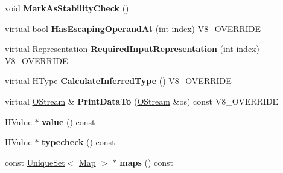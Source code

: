 \begin{DoxyCompactItemize}
\item 
\hypertarget{classv8_1_1internal_1_1_v8___f_i_n_a_l_a2334ff05114c5804c9eb729aab11bbf3}{}void {\bfseries Mark\+As\+Stability\+Check} ()\label{classv8_1_1internal_1_1_v8___f_i_n_a_l_a2334ff05114c5804c9eb729aab11bbf3}

\item 
\hypertarget{classv8_1_1internal_1_1_v8___f_i_n_a_l_ae559b1a39de93c2925ab5815da490738}{}virtual bool {\bfseries Has\+Escaping\+Operand\+At} (int index) V8\+\_\+\+O\+V\+E\+R\+R\+I\+D\+E\label{classv8_1_1internal_1_1_v8___f_i_n_a_l_ae559b1a39de93c2925ab5815da490738}

\item 
\hypertarget{classv8_1_1internal_1_1_v8___f_i_n_a_l_a6c6d1f37f40b113d8f4062f1ffff7215}{}virtual \hyperlink{classv8_1_1internal_1_1_representation}{Representation} {\bfseries Required\+Input\+Representation} (int index) V8\+\_\+\+O\+V\+E\+R\+R\+I\+D\+E\label{classv8_1_1internal_1_1_v8___f_i_n_a_l_a6c6d1f37f40b113d8f4062f1ffff7215}

\item 
\hypertarget{classv8_1_1internal_1_1_v8___f_i_n_a_l_a7a6782b8660ab150601db2ff28262edd}{}virtual H\+Type {\bfseries Calculate\+Inferred\+Type} () V8\+\_\+\+O\+V\+E\+R\+R\+I\+D\+E\label{classv8_1_1internal_1_1_v8___f_i_n_a_l_a7a6782b8660ab150601db2ff28262edd}

\item 
\hypertarget{classv8_1_1internal_1_1_v8___f_i_n_a_l_ac450dad970b14246be761ccf5004924b}{}virtual \hyperlink{classv8_1_1internal_1_1_o_stream}{O\+Stream} \& {\bfseries Print\+Data\+To} (\hyperlink{classv8_1_1internal_1_1_o_stream}{O\+Stream} \&os) const V8\+\_\+\+O\+V\+E\+R\+R\+I\+D\+E\label{classv8_1_1internal_1_1_v8___f_i_n_a_l_ac450dad970b14246be761ccf5004924b}

\item 
\hypertarget{classv8_1_1internal_1_1_v8___f_i_n_a_l_a998b3feae0e84bbe080297551603911f}{}\hyperlink{classv8_1_1internal_1_1_h_value}{H\+Value} $\ast$ {\bfseries value} () const \label{classv8_1_1internal_1_1_v8___f_i_n_a_l_a998b3feae0e84bbe080297551603911f}

\item 
\hypertarget{classv8_1_1internal_1_1_v8___f_i_n_a_l_a297f90abbad7e5d219fee0f76736f4f4}{}\hyperlink{classv8_1_1internal_1_1_h_value}{H\+Value} $\ast$ {\bfseries typecheck} () const \label{classv8_1_1internal_1_1_v8___f_i_n_a_l_a297f90abbad7e5d219fee0f76736f4f4}

\item 
\hypertarget{classv8_1_1internal_1_1_v8___f_i_n_a_l_a21bbb06ce228900cf75370413e3db40c}{}const \hyperlink{classv8_1_1internal_1_1_unique_set}{Unique\+Set}$<$ \hyperlink{classv8_1_1internal_1_1_map}{Map} $>$ $\ast$ {\bfseries maps} () const \label{classv8_1_1internal_1_1_v8___f_i_n_a_l_a21bbb06ce228900cf75370413e3db40c}


\end{DoxyCompactItemize}

